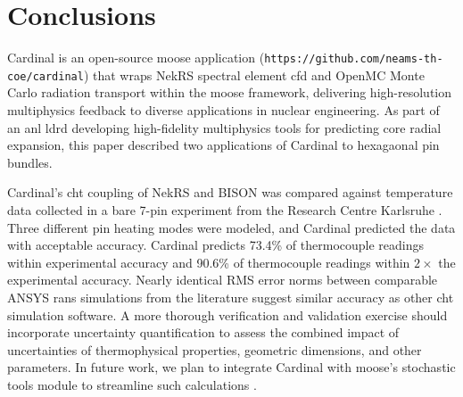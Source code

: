 \documentclass[3p,,preprint,11pt]{elsarticle}
\begin{document}
\begin{comment}
The binned operations are similar to the global operations, except that the domain is subdivided into smaller regions, or ``bins.'' The binned operations include side averages/integrals, plane averages/integrals, and volume averages/integrals. The spatial bins are taken as the outer product of a number of {\it distributions}, which can be Cartesian equal-width discretizations along the $x$/$y$/$z$ axes; radial equal-width discretizations along the radial coordinate; and the discretization found in subchannel thermal-fluid methods, where space is divided into interior, edge, and corner subchannels that are connected by gap planes. 


Several examples of this postprocessing system are now provided. Fig. \ref{fig:pressure_uo} shows the NekRS pressure averaged 
\end{comment}

\section{Conclusions}
\label{sec:conclusions}

Cardinal is an open-source \gls{moose} application ({\tt https://github.com/neams-th-coe/cardinal}) that wraps NekRS spectral element \gls{cfd} and OpenMC Monte Carlo radiation transport within the \gls{moose} framework, delivering high-resolution multiphysics feedback to diverse applications in nuclear engineering. As part of an \gls{anl} \gls{ldrd} developing high-fidelity multiphysics tools for predicting core radial expansion, this paper described two applications of Cardinal to hexagaonal pin bundles.

Cardinal's \gls{cht} coupling of NekRS and BISON was compared against temperature data collected in a bare 7-pin experiment from the Research Centre Karlsruhe \cite{cheng2009}. Three different pin heating modes were modeled, and Cardinal predicted the data with acceptable accuracy. Cardinal predicts 73.4\% of thermocouple readings within experimental accuracy and 90.6\% of thermocouple readings within $2\times$ the experimental accuracy. Nearly identical RMS error norms between comparable ANSYS \gls{rans} simulations from the literature \cite{cheng2009} suggest similar accuracy as other \gls{cht} simulation software. A more thorough verification and validation exercise should incorporate uncertainty quantification to assess the combined impact of uncertainties of thermophysical properties, geometric dimensions, and other parameters. In future work, we plan to integrate Cardinal with \gls{moose}'s stochastic tools module to streamline such calculations \cite{stochastic_tools}.
\end{document}
